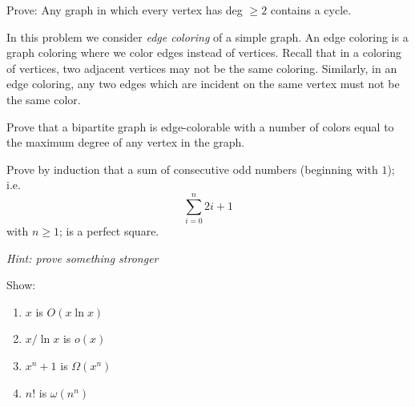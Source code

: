 \documentclass[12pt,oneside]{article}
\begin{document}
\begin{problem}{0}
Prove:  Any graph in which every vertex has deg $\ge 2$ contains a cycle.
\end{problem}

\begin{problem}{0}
In this problem we consider \emph{edge coloring} of a simple graph.  An edge coloring is a graph coloring where we color edges instead of vertices.  Recall that in a coloring of vertices, two adjacent vertices may not be the same coloring.  Similarly, in an edge coloring, any two edges which are incident on the same vertex must not be the same color. 

Prove that a bipartite graph is edge-colorable with a number of colors equal to the maximum degree of any vertex in the graph.
\end{problem}

\begin{problem}{0}
Prove by induction that a sum of consecutive odd numbers (beginning with $1$); i.e. $$\sum_{i=0}^{n}2i+1$$ with $n \ge 1$; is a perfect square.

\emph{Hint: prove something stronger}
\end{problem}


\begin{problem}

Show:

\begin{enumerate}
\item $x$ is $O\left( x\ln{x} \right)$
\item $x/\ln{x}$  is $o  \left( x \right)$
\item $x^n+1$ is $\Omega \left( x^n \right)$
\item $n!$ is $\omega \left( n^n \right)$
\end{enumerate}

\end{problem}
\end{document}
